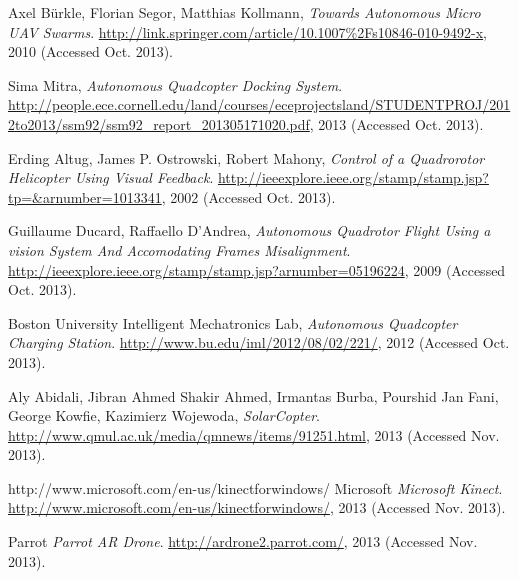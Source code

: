   Axel B\"urkle, Florian Segor, Matthias Kollmann,
  \emph{Towards Autonomous Micro UAV Swarms}.
  \url{http://link.springer.com/article/10.1007%2Fs10846-010-9492-x},
  2010 (Accessed Oct. 2013).

  Sima Mitra,
  \emph{Autonomous Quadcopter Docking System}.
  \url{http://people.ece.cornell.edu/land/courses/eceprojectsland/STUDENTPROJ/2012to2013/ssm92/ssm92_report_201305171020.pdf},
   2013 (Accessed Oct. 2013).

  Erding Altug, James P. Ostrowski, Robert Mahony,
  \emph{Control of a Quadrorotor Helicopter Using Visual Feedback}.
  \url{http://ieeexplore.ieee.org/stamp/stamp.jsp?tp=&arnumber=1013341},
   2002 (Accessed Oct. 2013).

  Guillaume Ducard, Raffaello D'Andrea,
  \emph{Autonomous Quadrotor Flight Using a vision System And Accomodating Frames Misalignment}.
  \url{http://ieeexplore.ieee.org/stamp/stamp.jsp?arnumber=05196224},
   2009 (Accessed Oct. 2013).

  Boston University Intelligent Mechatronics Lab, 
  \emph{Autonomous Quadcopter Charging Station}.
  \url{http://www.bu.edu/iml/2012/08/02/221/}, 
  2012 (Accessed Oct. 2013).

Aly Abidali, Jibran Ahmed Shakir Ahmed, Irmantas Burba, Pourshid Jan Fani, George Kowfie, Kazimierz Wojewoda,
  \emph{SolarCopter}.
  \url{http://www.qmul.ac.uk/media/qmnews/items/91251.html}, 
  2013 (Accessed Nov. 2013).

http://www.microsoft.com/en-us/kinectforwindows/
Microsoft
  \emph{Microsoft Kinect}.
  \url{http://www.microsoft.com/en-us/kinectforwindows/}, 
  2013 (Accessed Nov. 2013).

Parrot
  \emph{Parrot AR Drone}.
  \url{http://ardrone2.parrot.com/}, 
  2013 (Accessed Nov. 2013).



\bibitem{} %